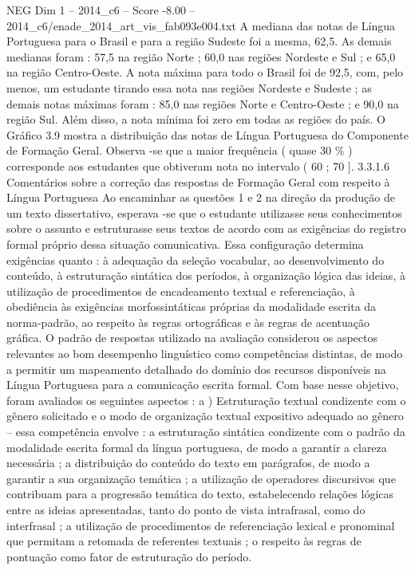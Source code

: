 \begin{textsample}{NEG Dim 1 – 2014\_c6 – Score -8.00 – 2014\_c6/enade\_2014\_art\_vis\_fab093e004.txt}
A mediana das notas de Língua Portuguesa para o Brasil e para a região Sudeste foi a mesma, 62,5.
As demais medianas foram : 57,5 na região Norte ; 60,0 nas regiões Nordeste e Sul ; e 65,0 na região Centro-Oeste.
A nota máxima para todo o Brasil foi de 92,5, com, pelo menos, um estudante tirando essa nota nas regiões Nordeste e Sudeste ; as demais notas máximas foram : 85,0 nas regiões Norte e Centro-Oeste ; e 90,0 na região Sul.
Além disso, a nota mínima foi zero em todas as regiões do país.
O Gráfico 3.9 mostra a distribuição das notas de Língua Portuguesa do Componente de Formação Geral.
Observa -se que a maior frequência ( quase 30 \% ) corresponde aos estudantes que obtiveram nota no intervalo ( 60 ; 70 ]. 3.3.1.6 Comentários sobre a correção das respostas de Formação Geral com respeito à Língua Portuguesa Ao encaminhar as questões 1 e 2 na direção da produção de um texto dissertativo, esperava -se que o estudante utilizasse seus conhecimentos sobre o assunto e estruturasse seus textos de acordo com as exigências do registro formal próprio dessa situação comunicativa.
Essa configuração determina exigências quanto : à adequação da seleção vocabular, ao desenvolvimento do conteúdo, à estruturação sintática dos períodos, à organização lógica das ideias, à utilização de procedimentos de encadeamento textual e referenciação, à obediência às exigências morfossintáticas próprias da modalidade escrita da norma-padrão, ao respeito às regras ortográficas e às regras de acentuação gráfica.
O padrão de respostas utilizado na avaliação considerou os aspectos relevantes ao bom desempenho linguístico como competências distintas, de modo a permitir um mapeamento detalhado do domínio dos recursos disponíveis na Língua Portuguesa para a comunicação escrita formal.
Com base nesse objetivo, foram avaliados os seguintes aspectos : a ) Estruturação textual condizente com o gênero solicitado e o modo de organização textual expositivo adequado ao gênero – essa competência envolve : a estruturação sintática condizente com o padrão da modalidade escrita formal da língua portuguesa, de modo a garantir a clareza necessária ; a distribuição do conteúdo do texto em parágrafos, de modo a garantir a sua organização temática ; a utilização de operadores discursivos que contribuam para a progressão temática do texto, estabelecendo relações lógicas entre as ideias apresentadas, tanto do ponto de vista intrafrasal, como do interfrasal ; a utilização de procedimentos de referenciação lexical e pronominal que permitam a retomada de referentes textuais ; o respeito às regras de pontuação como fator de estruturação do período.

\end{textsample}
